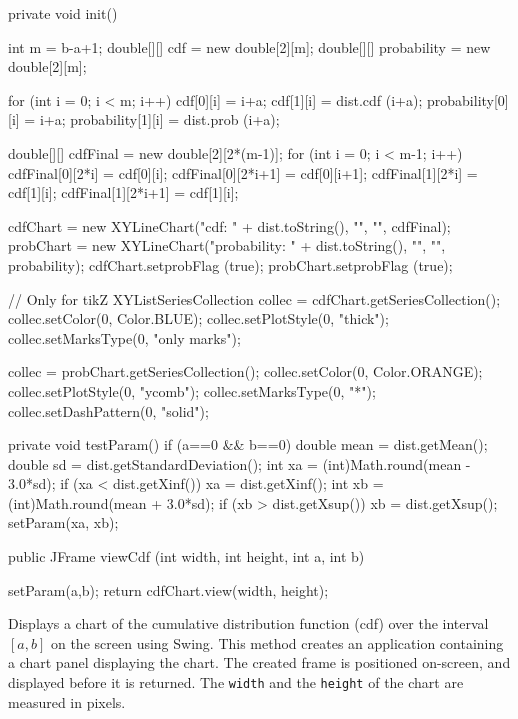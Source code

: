 \begin{code}\begin{hide}

   private void init() {
      int m = b-a+1;
      double[][] cdf = new double[2][m];
      double[][] probability = new double[2][m];

      for (int i = 0; i < m; i++) {
         cdf[0][i] = i+a;
         cdf[1][i] = dist.cdf (i+a);
         probability[0][i] = i+a;
         probability[1][i] = dist.prob (i+a);
      }

      double[][] cdfFinal = new double[2][2*(m-1)];
      for (int i = 0; i < m-1; i++) {
         cdfFinal[0][2*i] = cdf[0][i];
         cdfFinal[0][2*i+1] = cdf[0][i+1];
         cdfFinal[1][2*i] = cdf[1][i];
         cdfFinal[1][2*i+1] = cdf[1][i];
      }

      cdfChart = new XYLineChart("cdf: " + dist.toString(), "", "", cdfFinal);
      probChart = new XYLineChart("probability: " + dist.toString(), "",
                  "", probability);
      cdfChart.setprobFlag (true);
      probChart.setprobFlag (true);

      // Only for tikZ
      XYListSeriesCollection collec = cdfChart.getSeriesCollection();
      collec.setColor(0, Color.BLUE);
      collec.setPlotStyle(0, "thick");
      collec.setMarksType(0, "only marks");

      collec = probChart.getSeriesCollection();
      collec.setColor(0, Color.ORANGE);
      collec.setPlotStyle(0, "ycomb");
      collec.setMarksType(0, "*");
      collec.setDashPattern(0, "solid");
   }

   private void testParam() {
      if (a==0 && b==0) {
         double mean = dist.getMean();
         double sd = dist.getStandardDeviation();
         int xa = (int)Math.round(mean - 3.0*sd);
         if (xa < dist.getXinf())
            xa = dist.getXinf();
         int xb = (int)Math.round(mean + 3.0*sd);
         if (xb > dist.getXsup())
            xb = dist.getXsup();
         setParam(xa, xb);
      }
   }
\end{hide}

   public JFrame viewCdf (int width, int height, int a, int b) \begin{hide} {
      setParam(a,b);
      return cdfChart.view(width, height);
   }\end{hide}
\end{code}
\begin{tabb}
   Displays a chart of the cumulative distribution function (cdf) over the
   interval $[a,b]$ on the screen using Swing. This method creates an
   application containing a chart panel displaying the chart. The created
   frame is positioned on-screen, and displayed before it is returned. The
   \texttt{width} and the \texttt{height} of the chart are measured in pixels.
\end{tabb}
